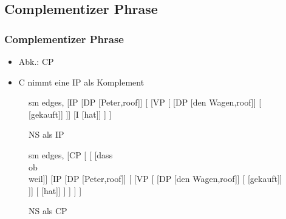 \subsection{Complementizer Phrase}

\begin{frame}
\frametitle{Complementizer Phrase}

\begin{itemize}
	\item Abk.: CP
	\item C nimmt eine IP als Komplement
\end{itemize}

\begin{figure}[b]
	\begin{minipage}[b]{0.45\textwidth}
	\centering
	\tiny{
		\begin{forest}
		sm edges,
		[IP [DP [Peter,roof]]
			[ [VP 
					[ [DP [den Wagen,roof]]
						[ [gekauft]]
						]]
				[I [hat]]
				]
		]
		\end{forest}
		}
		\caption{NS als IP}	
  	\end{minipage}  
  	\begin{minipage}[b]{0.05\textwidth}
	\hfill
	\end{minipage}  
	\begin{minipage}[b]{0.45\textwidth}
	\centering
	\tiny{
		\begin{forest}
		sm edges,
[CP	[	[ [\alert{dass}\\ \alert{ob}\\ \alert{weil}]]	
		[IP [DP [Peter,roof]]
			[\MyPxbar{I} [VP
					[ [DP [den Wagen,roof]]
						[\zerobar{V} [gekauft]]
						]]
				[\zerobar{I} [hat]]
				]
		]
	]
]
		\end{forest}
		}
		\caption{NS als CP}	
  	\end{minipage}  
\end{figure}

\end{frame}


